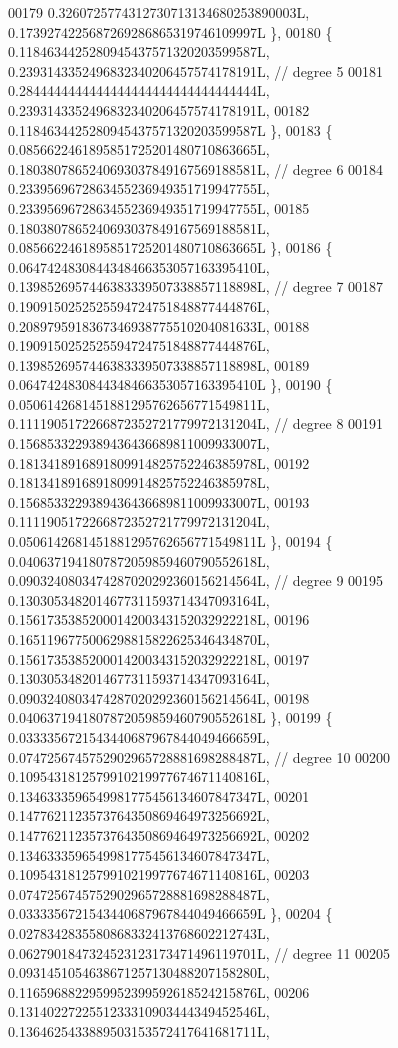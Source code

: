 \begin{DoxyCode}
00179       0.3260725774312730713134680253890003L, 0.1739274225687269286865319746109997L \},
00180     \{ 0.1184634425280945437571320203599587L, 0.2393143352496832340206457574178191L,  \textcolor{comment}{// degree 5}
00181       0.2844444444444444444444444444444444L, 0.2393143352496832340206457574178191L,
00182       0.1184634425280945437571320203599587L \},
00183     \{ 0.0856622461895851725201480710863665L, 0.1803807865240693037849167569188581L,  \textcolor{comment}{// degree 6}
00184       0.2339569672863455236949351719947755L, 0.2339569672863455236949351719947755L,
00185       0.1803807865240693037849167569188581L, 0.0856622461895851725201480710863665L \},
00186     \{ 0.0647424830844348466353057163395410L, 0.1398526957446383339507338857118898L,  \textcolor{comment}{// degree 7}
00187       0.1909150252525594724751848877444876L, 0.2089795918367346938775510204081633L,
00188       0.1909150252525594724751848877444876L, 0.1398526957446383339507338857118898L,
00189       0.0647424830844348466353057163395410L \},
00190     \{ 0.0506142681451881295762656771549811L, 0.1111905172266872352721779972131204L,  \textcolor{comment}{// degree 8}
00191       0.1568533229389436436689811009933007L, 0.1813418916891809914825752246385978L,
00192       0.1813418916891809914825752246385978L, 0.1568533229389436436689811009933007L,
00193       0.1111905172266872352721779972131204L, 0.0506142681451881295762656771549811L \},
00194     \{ 0.0406371941807872059859460790552618L, 0.0903240803474287020292360156214564L,  \textcolor{comment}{// degree 9}
00195       0.1303053482014677311593714347093164L, 0.1561735385200014200343152032922218L,
00196       0.1651196775006298815822625346434870L, 0.1561735385200014200343152032922218L,
00197       0.1303053482014677311593714347093164L, 0.0903240803474287020292360156214564L,
00198       0.0406371941807872059859460790552618L \},
00199     \{ 0.0333356721543440687967844049466659L, 0.0747256745752902965728881698288487L,  \textcolor{comment}{// degree 10}
00200       0.1095431812579910219977674671140816L, 0.1346333596549981775456134607847347L,
00201       0.1477621123573764350869464973256692L, 0.1477621123573764350869464973256692L,
00202       0.1346333596549981775456134607847347L, 0.1095431812579910219977674671140816L,
00203       0.0747256745752902965728881698288487L, 0.0333356721543440687967844049466659L \},
00204     \{ 0.0278342835580868332413768602212743L, 0.0627901847324523123173471496119701L,  \textcolor{comment}{// degree 11}
00205       0.0931451054638671257130488207158280L, 0.1165968822959952399592618524215876L,
00206       0.1314022722551233310903444349452546L, 0.1364625433889503153572417641681711L,

\end{DoxyCode}
